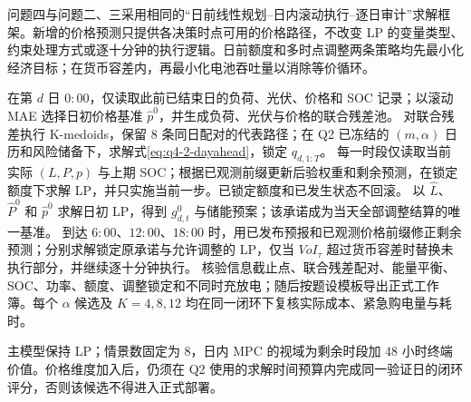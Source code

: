 问题四与问题二、三采用相同的“日前线性规划--日内滚动执行--逐日审计”求解框架。新增的价格预测只提供各决策时点可用的价格路径，不改变 LP 的变量类型、约束处理方式或逐十分钟的执行逻辑。日前额度和多时点调整两条策略均先最小化经济目标；在货币容差内，再最小化电池吞吐量以消除等价循环。

\algorithmstart
{}
在第 $d$ 日 $0{:}00$，仅读取此前已结束日的负荷、光伏、价格和 SOC 记录；以滚动 MAE 选择日初价格基准 $\widehat p^0$，并生成负荷、光伏与价格的联合残差池。
对联合残差执行 K-medoids，保留 $8$ 条同日配对的代表路径；在 Q2 已冻结的 $(m,\alpha)$ 日历和风险储备下，求解式\eqref{eq:q4-2-dayahead}，锁定 $q_{d,1:T}$。
每一时段仅读取当前实际 $(L,P,p)$ 与上期 SOC；根据已观测前缀更新后验权重和剩余预测，在锁定额度下求解 LP，并只实施当前一步。已锁定额度和已发生状态不回滚。
以 $\widehat L$、$\widehat P^0$ 和 $\widehat p^0$ 求解日初 LP，得到 $g^0_{d,t}$ 与储能预案；该承诺成为当天全部调整结算的唯一基准。
到达 $6{:}00$、$12{:}00$、$18{:}00$ 时，用已发布预报和已观测价格前缀修正剩余预测；分别求解锁定原承诺与允许调整的 LP，仅当 $VoI_\tau$ 超过货币容差时替换未执行部分，并继续逐十分钟执行。
核验信息截止点、联合残差配对、能量平衡、SOC、功率、额度、调整锁定和不同时充放电；随后按题设模板导出正式工作簿。每个 $\alpha$ 候选及 $K=4,8,12$ 均在同一闭环下复核实际成本、紧急购电量与耗时。
\algorithmend

主模型保持 LP；情景数固定为 $8$，日内 MPC 的视域为剩余时段加 $48$ 小时终端价值。价格维度加入后，仍须在 Q2 使用的求解时间预算内完成同一验证日的闭环评分，否则该候选不得进入正式部署。
